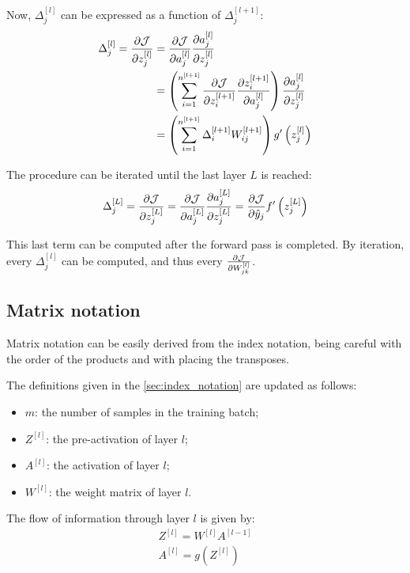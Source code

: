 Now, $\Delta_j^{[l]}$ can be expressed as a function of $\Delta_j^{[l + 1]}$:
\begin{align*}
    \Delta_j^{[l]} = \pdv{\mathcal{J}}{z_j^{[l]}} &= \pdv{\mathcal{J}}{a_j^{[l]}} \pdv{a_j^{[l]}}{z_j^{[l]}}\\
    &= \left( \sum_{i=1}^{n^{[l + 1]}} \pdv{\mathcal{J}}{z_i^{[l+1]}} \pdv{z_i^{[l+1]}}{a_j^{[l]}} \right) \pdv{a_j^{[l]}}{z_j^{[l]}}\\
    &= \left( \sum_{i=1}^{n^{[l + 1]}} \Delta_i^{[l+1]} W_{ij}^{[l+1]} \right) g'\left(z_j^{[l]}\right)
\end{align*}

The procedure can be iterated until the last layer $L$ is reached:
\begin{align*}
    \Delta_j^{[L]} = \pdv{\mathcal{J}}{z_j^{[L]}} = \pdv{\mathcal{J}}{a_j^{[L]}} \pdv{a_j^{[L]}}{z_j^{[L]}} = \pdv{\mathcal{J}}{\hat{y}_j} f'\left(z_j^{[L]}\right)
\end{align*}

This last term can be computed after the forward pass is completed. By iteration, every $\Delta_j^{[l]}$ can be computed, and thus every $\pdv{\mathcal{J}}{W_{jk}^{[l]}}$.

\subsection{Matrix notation} \label{sec:matrix_notation}
Matrix notation can be easily derived from the index notation, being careful with the order of the products and with placing the transposes.

The definitions given in the \cref{sec:index_notation} are updated as follows:
\begin{itemize}
    \item $m$: the number of samples in the training batch;
    \item $Z^{[l]}$: the  pre-activation of layer $l$;
    \item $A^{[l]}$: the  activation of layer $l$;
    \item $W^{[l]}$: the  weight matrix of layer $l$.
\end{itemize}

The flow of information through layer $l$ is given by:
\begin{gather}
    Z^{[l]} = W^{[l]} A^{[l-1]} \label{eq:lin_forward}\\
    A^{[l]} = g\left(Z^{[l]}\right) \label{eq:act_forward}
\end{gather}

